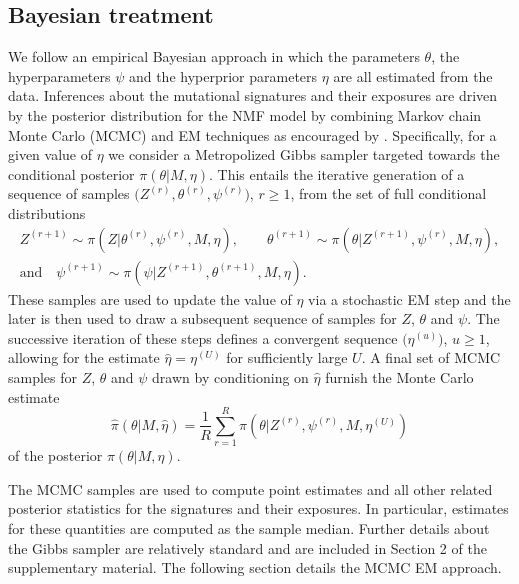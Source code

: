 \documentclass{bioinfo}
\begin{document}
\subsection{Bayesian treatment}
We follow an empirical Bayesian approach in which the parameters
$\theta$, the hyperparameters $\psi$ and the hyperprior parameters
$\eta$ are all estimated from the data.  Inferences about the
mutational signatures and their exposures are driven by the
posterior distribution for the NMF model by combining
Markov chain Monte Carlo (MCMC) and EM techniques as encouraged by
\cite{C01}. Specifically, for a given value of $\eta$ we consider a
Metropolized Gibbs sampler targeted towards the conditional posterior
$\pi(\theta|M, \eta)$. This entails the iterative generation of a
sequence of samples $\big(Z^{(r)}, \theta^{(r)}, \psi^{(r)}\big)$, $r
\geqslant 1$, from the set of full conditional distributions
\begin{gather*}
   Z^{(r+1)} \sim \pi(Z| \theta^{(r)}, \psi^{(r)}, M, \eta), \qquad
   \theta^{(r+1)} \sim \pi(\theta| Z^{(r+1)}, \psi^{(r)}, M, \eta), \\
       \text{and}\quad
   \psi^{(r+1)} \sim \pi(\psi| Z^{(r+1)}, \theta^{(r+1)}, M, \eta).
\end{gather*}
These samples are used to update the value of $\eta$ via a stochastic
EM step and the later is then used to draw a subsequent sequence of
samples for $Z$, $\theta$ and $\psi$. The successive iteration of
these steps defines a convergent sequence $\big(\eta^{(u)}\big)$, $u
\geq 1$, allowing for the estimate $\hat\eta = \eta^{(U)}$ for
sufficiently large $U$. A final set of MCMC samples for $Z$, $\theta$
and $\psi$ drawn by conditioning on $\hat\eta$ furnish the 
Monte Carlo estimate
\begin{equation}
 \label{eqn:MCEM_estimate}
   \widehat{\pi}(\theta|M, \hat\eta)
 = 
   \frac{1}{R}\sum_{r=1}^R \pi(\theta|Z^{(r)}, \psi^{(r)}, M,
   \eta^{(U)})
\end{equation}
of the posterior $\pi(\theta|M, \eta)$.


The MCMC samples are used to compute point estimates and all other
related posterior statistics for the signatures and their exposures. 
In particular, estimates for these quantities are computed as the
sample median. Further details about the Gibbs sampler are relatively
standard and are included in  Section 2 of the supplementary
material. The following section details the MCMC EM approach.
\end{document}
